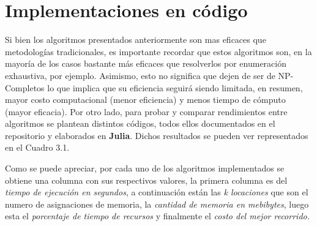             \section{Implementaciones en código}
                Si bien los algoritmos presentados anteriormente son mas eficaces que metodologías tradicionales, es importante recordar que estos algoritmos son, en la mayoría de los casos bastante más eficaces que resolverlos por enumeración exhaustiva, por ejemplo. Asimismo, esto no significa que dejen de ser de NP-Completos lo que implica que su eficiencia seguirá siendo limitada, en resumen, mayor costo computacional (menor eficiencia) y menos tiempo de cómputo (mayor eficacia). 
                \newline
                \newline
                Por otro lado, para probar y comparar rendimientos entre algoritmos se plantean distintos códigos, todos ellos documentados en el repositorio \parencite{RepoTSP} y elaborados en \textbf{Julia}. Dichos resultados se pueden ver representados en el Cuadro 3.1.
                \newline
                \begin{table}[ht]
                  \centering
                  \caption{Comparación de resultados}
                  \label{tab:resultados}
                \end{table}
                \newline
                Como se puede apreciar, por cada uno de los algoritmos implementados se obtiene una columna con sus respectivos valores, la primera columna es del \textit{tiempo de ejecución en segundos}, a continuación están las \textit{k locaciones} que son el numero de asignaciones de memoria, la \textit{cantidad de memoria en mebibytes}, luego esta el \textit{porcentaje de tiempo de recursos} y finalmente el \textit{costo del mejor recorrido.} 
